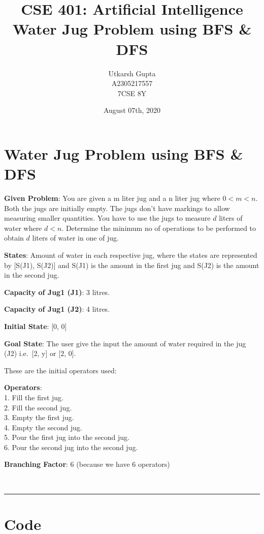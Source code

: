 \documentclass[11pt]{article}
\title{%
    CSE 401: Artificial Intelligence \\
    \large Water Jug Problem using BFS & DFS}
\author{%
      Utkarsh Gupta \\
      \small A2305217557 \\
      \small 7CSE 8Y}
\date{August 07th, 2020}
\begin{document}
    
    \maketitle
    
    
\hypertarget{water-jug-problem}{%
\section{Water Jug Problem using BFS \& DFS}\label{water-jug-problem}}

    \textbf{Given Problem}: You are given a m liter jug and a n liter jug where
\(0 < m < n\). Both the jugs are initially empty. The jugs don't have
markings to allow measuring smaller quantities. You have to use the jugs
to measure \(d\) liters of water where \(d < n\). Determine the minimum
no of operations to be performed to obtain \(d\) liters of water in one
of jug.

    \textbf{States}: Amount of water in each respective jug, where the states are
represented by {[}S(J1), S(J2){]} and S(J1) is the amount in the first
jug and S(J2) is the amount in the second jug.

\textbf{Capacity of Jug1 (J1)}: 3 litres.

\textbf{Capacity of Jug1 (J2)}: 4 litres.

\textbf{Initial State}: {[}0, 0{]}

\textbf{Goal State}: The user give the input the amount of water required in the
jug (J2) i.e.~{[}2, y{]} or {[}2, 0{]}.

These are the initial operators used:

\textbf{Operators}:\\
1. Fill the first jug.\\
2. Fill the second jug.\\
3. Empty the first jug.\\
4. Empty the second jug.\\
5. Pour the first jug into the second jug.\\
6. Pour the second jug into the second jug.

\textbf{Branching Factor}: 6 (because we have 6 operators)

    ~\\
    \noindent\rule{16.5cm}{0.4pt}
    \newpage

    \section{Code}
\end{document}
